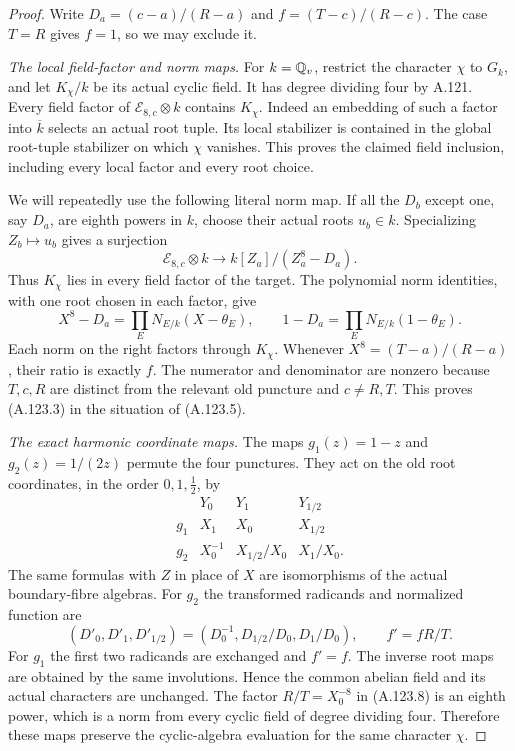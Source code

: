 \begin{proof}
Write $D_a=(c-a)/(R-a)$ and $f=(T-c)/(R-c)$.
The case $T=R$ gives $f=1$, so we may exclude it.

\emph{The local field-factor and norm maps.}
For $k=\mathbb Q_v$, restrict the character $\chi$ to $G_k$,
and let $K_\chi/k$ be its actual cyclic field.
It has degree dividing four by A.121.
Every field factor of $\mathcal E_{8,c}\otimes k$
contains $K_\chi$.
Indeed an embedding of such a factor into $\overline k$
selects an actual root tuple.
Its local stabilizer is contained in the global
root-tuple stabilizer on which $\chi$ vanishes.
This proves the claimed field inclusion, including
every local factor and every root choice.

We will repeatedly use the following literal norm map.
If all the $D_b$ except one, say $D_a$, are eighth
powers in $k$, choose their actual roots $u_b\in k$.
Specializing $Z_b\mapsto u_b$ gives a surjection
\[
 \mathcal E_{8,c}\otimes k
             \longrightarrow k[Z_a]/(Z_a^8-D_a).
\tag{A.123.5}
\]
Thus $K_\chi$ lies in every field factor of the target.
The polynomial norm identities, with one root chosen
in each factor, give
\[
 X^8-D_a=\prod_E N_{E/k}(X-\theta_E),\qquad
 1-D_a=\prod_E N_{E/k}(1-\theta_E).
\tag{A.123.6}
\]
Each norm on the right factors through $K_\chi$.
Whenever $X^8=(T-a)/(R-a)$, their ratio is exactly $f$.
The numerator and denominator are nonzero because
$T,c,R$ are distinct from the relevant old puncture
and $c\ne R,T$.
This proves (A.123.3) in the situation of (A.123.5).

\emph{The exact harmonic coordinate maps.}
The maps $g_1(z)=1-z$ and $g_2(z)=1/(2z)$ permute
the four punctures.
They act on the old root coordinates, in the order
$0,1,\tfrac12$, by
\[
 \begin{array}{c|ccc}
        &Y_0&Y_1&Y_{1/2}\\ \hline
  g_1&X_1&X_0&X_{1/2}\\
  g_2&X_0^{-1}&X_{1/2}/X_0&X_1/X_0.
 \end{array}
\tag{A.123.7}
\]
The same formulas with $Z$ in place of $X$ are
isomorphisms of the actual boundary-fibre algebras.
For $g_2$ the transformed radicands and normalized
function are
\[
 (D'_0,D'_1,D'_{1/2})
       =(D_0^{-1},D_{1/2}/D_0,D_1/D_0),
                 \qquad f'=fR/T.
\tag{A.123.8}
\]
For $g_1$ the first two radicands are exchanged
and $f'=f$.
The inverse root maps are obtained by the same
involutions.
Hence the common abelian field and its actual
characters are unchanged.
The factor $R/T=X_0^{-8}$ in (A.123.8) is an eighth
power, which is a norm from every cyclic field of
degree dividing four.
Therefore these maps preserve the cyclic-algebra
evaluation for the same character $\chi$.


\end{proof}
